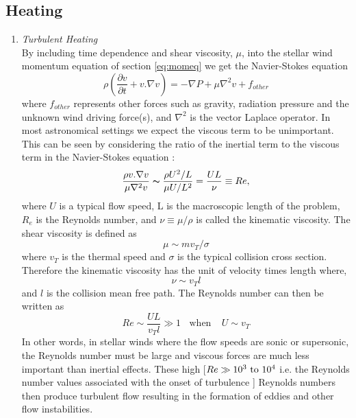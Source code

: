 \subsection{Heating}
\begin{enumerate}
\item{\textit{Turbulent Heating}}\\
By including time dependence and shear viscosity, $\mu$, into the stellar wind momentum equation of section \ref{eq:momeq} we get the Navier-Stokes equation
%
\begin{equation}
\rho \left(\frac{\partial v}{\partial t}+v. \nabla v\right)=-\nabla P + \mu \nabla ^2{v} + f_{other}
\end{equation} 
%
where $f_{other}$ represents other forces such as gravity, radiation pressure and the unknown wind driving force(s), and $\nabla ^2$ is the vector Laplace operator. In most astronomical settings we expect the viscous term to be unimportant. This can be seen by considering the ratio of the inertial term to the viscous term in the Navier-Stokes equation \cite{1992pavi.book.....S}:
%
\begin{equation}
\frac{\rho v.\nabla v}{\mu \nabla ^2 v} \thicksim \frac{\rho U^2 /L}{\mu U / L^2}=\frac{UL}{\nu} \equiv Re,
\end{equation} 
%
where $U$ is a typical flow speed, L is the macroscopic length of the problem, $R_{e}$ is the Reynolds number, and $\nu \equiv \mu /\rho$ is called the kinematic viscosity. The shear viscosity is defined as
\begin{equation}
\mu \sim mv_{T}/\sigma
\end{equation} 
where $v_{T}$ is the thermal speed and $\sigma$ is the typical collision cross section. Therefore the kinematic viscosity has the unit of velocity times length where,
\begin{equation}
\nu \sim v_{T}l
\end{equation} 
and $l$ is the collision mean free path. The Reynolds number can then be written as \cite{1992pavi.book.....S}
\begin{equation}
Re \sim \frac{UL}{v_{T}l} \gg 1 \ \ \ \ \mathrm{when} \ \ \ \ \ U \sim v_{T}
\end{equation} 
In other words, in stellar winds where the flow speeds are sonic or supersonic, the Reynolds number must be large and viscous forces are much less important than inertial effects. These high [$Re \gg 10^3 \ \rm{to} \ 10^4$ i.e. the Reynolds number values associated with the onset of turbulence \cite{1998ISAA....4.....H}] Reynolds numbers then produce turbulent flow resulting in the formation of eddies and other flow instabilities.\\

\end{enumerate}
